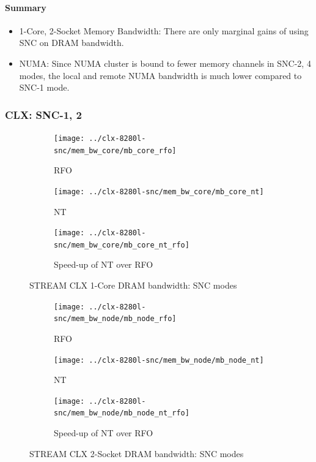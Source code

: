 \documentclass{article}
\begin{document}
\paragraph{Summary}
\begin{itemize}
\item 1-Core, 2-Socket Memory Bandwidth: There are only marginal gains of using SNC on DRAM bandwidth.
\item NUMA: Since NUMA cluster is bound to fewer memory channels in SNC-2, 4 modes, the local and remote NUMA bandwidth is much lower compared to SNC-1 mode.
\end{itemize}
\clearpage
\subsubsection{CLX: SNC-1, 2}

\begin{figure}[!hb]
    \centering
    \begin{subfigure}[!hb]{0.3\textwidth}
         \centering
         \texttt{[image: ../clx-8280l-snc/mem\_bw\_core/mb\_core\_rfo]}
         \caption{RFO}
         \label{figure:mem_bw_core_rfo_clx_snc}
    \end{subfigure}
    \begin{subfigure}[!hb]{0.3\textwidth}
         \centering
         \texttt{[image: ../clx-8280l-snc/mem\_bw\_core/mb\_core\_nt]}
         \caption{NT}
         \label{figure:mem_bw_core_nt_clx_snc}
    \end{subfigure}
    \begin{subfigure}[!hb]{0.3\textwidth}
         \centering
         \texttt{[image: ../clx-8280l-snc/mem\_bw\_core/mb\_core\_nt\_rfo]}
         \caption{Speed-up of NT over RFO}
         \label{figure:mem_bw_core_nt_rfo_clx_snc}
    \end{subfigure}

    \caption{STREAM CLX 1-Core DRAM bandwidth: SNC modes}
    \label{figure:mem_bw_core_clx_snc}
\end{figure}

\begin{figure}[!hb]
    \centering
    \begin{subfigure}[!hb]{0.3\textwidth}
         \centering
         \texttt{[image: ../clx-8280l-snc/mem\_bw\_node/mb\_node\_rfo]}
         \caption{RFO}
         \label{figure:mem_bw_node_rfo_clx_snc}
    \end{subfigure}
    \begin{subfigure}[!hb]{0.3\textwidth}
         \centering
         \texttt{[image: ../clx-8280l-snc/mem\_bw\_node/mb\_node\_nt]}
         \caption{NT}
         \label{figure:mem_bw_node_nt_clx_snc}
    \end{subfigure}
    \begin{subfigure}[!hb]{0.3\textwidth}
         \centering
         \texttt{[image: ../clx-8280l-snc/mem\_bw\_node/mb\_node\_nt\_rfo]}
         \caption{Speed-up of NT over RFO}
         \label{figure:mem_bw_node_nt_rfo_clx_snc}
    \end{subfigure}

    \caption{STREAM CLX 2-Socket DRAM bandwidth: SNC modes}
    \label{figure:mem_bw_node_clx_snc}
\end{figure}
\end{document}
